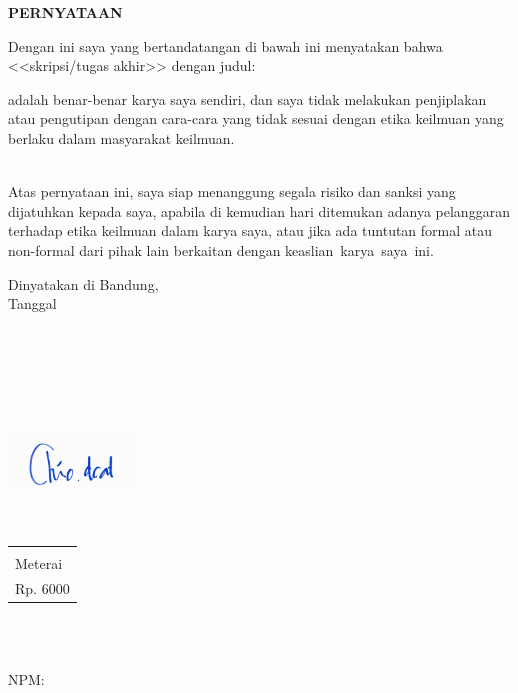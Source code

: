 \documentclass[11pt,a4paper,twoside,openright,notitlepage]{report}
\newcommand{\rtext}[1]{{\color{red} \small #1}}%
\newcommand{\vstaINA}{\rtext{<<SKRIPSI/TUGAS AKHIR>>}}
\begin{document}
{{{	%
	\vspace*{4cm}
	\begin{center} 
		{\Large \textbf{PERNYATAAN}\\} \vspace{1cm}
	\end{center}
	{\noindent Dengan ini saya yang bertandatangan di bawah ini menyatakan bahwa \MakeLowercase{\vstaINA} dengan judul:  \vspace{0.5cm}
	\begin{center} {\large \textbf{\vjudulINA}}\end{center}
	\vspace{0.5cm}
	adalah benar-benar karya saya sendiri, dan saya tidak melakukan penjiplakan atau pengutipan dengan cara-cara yang tidak sesuai dengan etika keilmuan yang berlaku dalam masyarakat keilmuan.}
	\vspace{0pt}\\
	{\noindent			
	Atas pernyataan ini, saya siap menanggung segala risiko dan sanksi yang dijatuhkan kepada saya, apabila di kemudian hari ditemukan adanya pelanggaran terhadap etika keilmuan dalam karya saya, atau jika ada tuntutan formal atau non-formal dari pihak lain berkaitan dengan keaslian~karya~saya~ini.\\}
	\vspace{0.25cm}
	
	\begin{flushright}	
		Dinyatakan di Bandung,\\
		Tanggal \vtanggal\ \vbulan\ \vtahun \\
		    {\begin{Form} \ \digsigfield{5cm}{2.25cm}{\vnama}\ \end{Form}\\}
		    {
		        {\includegraphics[width=3.5cm,height=3.5cm,keepaspectratio]{ttd}\\}
		        {{
		            {\vspace{0.5cm}
        		    \begin{tabular}{|p{1.75cm}|}\hline\\Meterai\\Rp. 6000\\ \hline\end{tabular}\\\vspace{0.5cm}}
        		    {\vspace{2.5cm}}
		        }
		        }    
        	}
		\vnama \\
		NPM: \vnpm
	\end{flushright}
	 \cleardoublepage 

}}}
\end{document}
